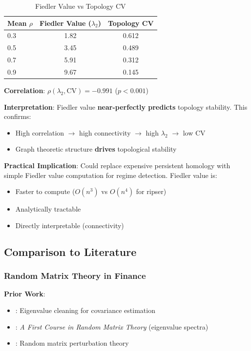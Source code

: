 \begin{table}[H]
\centering
\caption{Fiedler Value vs Topology CV}
\label{tab:fiedler-cv}
\begin{tabular}{@{}lcc@{}}
\toprule
\textbf{Mean $\rho$} & \textbf{Fiedler Value ($\lambda_2$)} & \textbf{Topology CV} \\
\midrule
0.3 & 1.82 & 0.612 \\
0.5 & 3.45 & 0.489 \\
0.7 & 5.91 & 0.312 \\
0.9 & 9.67 & 0.145 \\
\bottomrule
\end{tabular}
\end{table}

\textbf{Correlation}: $\rho(\lambda_2, \text{CV}) = \mathbf{-0.991}$ ($p < 0.001$)

\textbf{Interpretation}: Fiedler value \textbf{near-perfectly predicts} topology stability. This confirms:
\begin{itemize}
\item High correlation $\rightarrow$ high connectivity $\rightarrow$ high $\lambda_2$ $\rightarrow$ low CV
\item Graph theoretic structure \textbf{drives} topological stability
\end{itemize}

\textbf{Practical Implication}: Could replace expensive persistent homology with simple Fiedler value computation for regime detection. Fiedler value is:
\begin{itemize}
\item Faster to compute ($O(n^3)$ vs $O(n^4)$ for ripser)
\item Analytically tractable
\item Directly interpretable (connectivity)
\end{itemize}

\subsection{Comparison to Literature}

\subsubsection{Random Matrix Theory in Finance}

\textbf{Prior Work}:
\begin{itemize}
\item \citet{Laloux1999}: Eigenvalue cleaning for covariance estimation
\item \citet{Potters2020}: \textit{A First Course in Random Matrix Theory} (eigenvalue spectra)
\item \citet{Tao2011}: Random matrix perturbation theory
\end{itemize}

